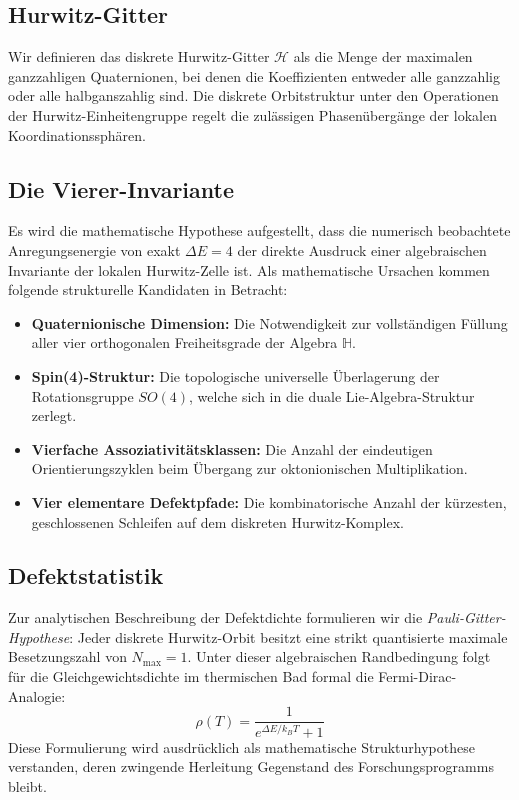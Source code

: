 \documentclass[11pt,a4paper]{article}
\newcommand{\Halg}{\mathbb{H}}
\begin{document}
\subsection{Hurwitz-Gitter}
Wir definieren das diskrete Hurwitz-Gitter $\mathcal{H}$ als die Menge der maximalen ganzzahligen Quaternionen, bei denen die Koeffizienten entweder alle ganzzahlig oder alle halbganszahlig sind. Die diskrete Orbitstruktur unter den Operationen der Hurwitz-Einheitengruppe regelt die zulässigen Phasenübergänge der lokalen Koordinationssphären.

\subsection{Die Vierer-Invariante}
Es wird die mathematische Hypothese aufgestellt, dass die numerisch beobachtete Anregungsenergie von exakt $\Delta E = 4$ der direkte Ausdruck einer algebraischen Invariante der lokalen Hurwitz-Zelle ist. Als mathematische Ursachen kommen folgende strukturelle Kandidaten in Betracht:
\begin{itemize}
	\item \textbf{Quaternionische Dimension:} Die Notwendigkeit zur vollständigen Füllung aller vier orthogonalen Freiheitsgrade der Algebra $\Halg$.
	\item \textbf{Spin(4)-Struktur:} Die topologische universelle Überlagerung der Rotationsgruppe $SO(4)$, welche sich in die duale Lie-Algebra-Struktur zerlegt.
	\item \textbf{Vierfache Assoziativitätsklassen:} Die Anzahl der eindeutigen Orientierungszyklen beim Übergang zur oktonionischen Multiplikation.
	\item \textbf{Vier elementare Defektpfade:} Die kombinatorische Anzahl der kürzesten, geschlossenen Schleifen auf dem diskreten Hurwitz-Komplex.
\end{itemize}

\subsection{Defektstatistik}
Zur analytischen Beschreibung der Defektdichte formulieren wir die \textit{Pauli-Gitter-Hypothese}: Jeder diskrete Hurwitz-Orbit besitzt eine strikt quantisierte maximale Besetzungszahl von $N_{\max} = 1$. Unter dieser algebraischen Randbedingung folgt für die Gleichgewichtsdichte im thermischen Bad formal die Fermi-Dirac-Analogie:
\begin{equation}
	\rho(T) = \frac{1}{e^{\Delta E / k_B T} + 1}
\end{equation}
Diese Formulierung wird ausdrücklich als mathematische Strukturhypothese verstanden, deren zwingende Herleitung Gegenstand des Forschungsprogramms bleibt.
\end{document}
